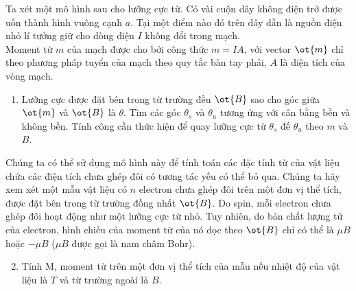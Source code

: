     
\begin{vd}
    Ta xét một mô hình sau cho lưỡng cực từ. Có vài cuộn dây không điện trở được uốn thành hình vuông cạnh $a$. Tại một điểm nào đó trên dây dẫn là nguồn điện nhỏ lí tưởng giữ cho dòng điện $I$ không đổi trong mạch.
    \\ Moment từ $m$ của mạch được cho bởi công thức $m=IA$, với vector $\ot{m}$ chỉ theo phương pháp tuyển của mạch theo quy tắc bàn tay phải, $A$ là diện tích của vòng mạch.
    \begin{enumerate}[1)]
        \item Lưỡng cực được đặt bên trong từ trường đều $\ot{B}$ sao cho góc giữa $\ot{m}$ và $\ot{B}$ là $\theta$. Tìm các góc $\theta_s$ và $\theta_u$ tương ứng với cân bằng bền và không bền. Tính công cần thức hiện để quay lưỡng cực từ $\theta_s$ đế $\theta_u$ theo $m$ và $B$.
    \end{enumerate}
    Chúng ta có thể sử dụng mô hình này để tính toán các đặc tính từ của vật liệu chứa các điện tích chưa ghép đôi có tương tác yếu có thể bỏ qua. Chúng ta hãy xem xét một mẫu vật liệu có $n$ electron chưa ghép đôi trên một đơn vị thể tích, được đặt bên trong từ trường đồng nhất $\ot{B}$. Do spin, mỗi electron chưa ghép đôi hoạt động như một lưỡng cực từ nhỏ. Tuy nhiên, do bản chất lượng tử của electron, hình chiếu của moment từ của nó dọc theo $\ot{B}$ chỉ có thể là $\mu B$ hoặc $-\mu B$ ($\mu B$ được gọi là nam châm Bohr).
    \begin{enumerate}[1)]
    \setcounter{enumi}{1}
        \item Tính M, moment từ trên một đơn vị thể tích của mẫu nếu nhiệt độ của vật liệu là $T$ và từ trường ngoài là $B$.
    \end{enumerate}
\end{vd}

